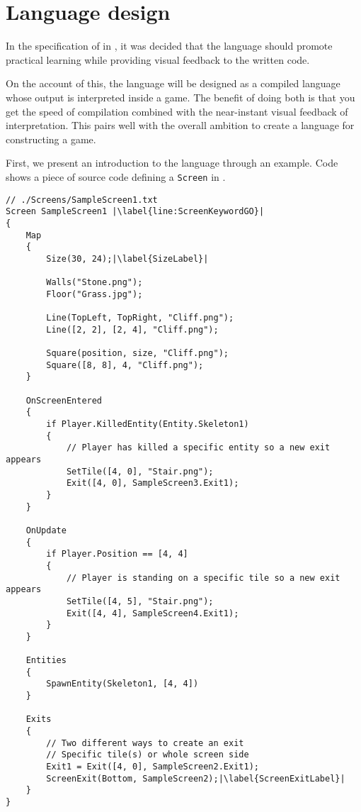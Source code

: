 \chapter{Language design}\label{chap:language_design}
In the specification of \dazel{} in , it was decided that the language should promote practical learning while providing visual feedback to the written code. 

On the account of this, the \dazel{} language will be designed as a compiled language whose output is interpreted inside a game.
The benefit of doing both is that you get the speed of compilation combined with the near-instant visual feedback of interpretation.
This pairs well with the overall ambition to create a language for constructing a game.

First, we present an introduction to the \dazel{} language through an example. Code  shows a piece of source code defining a \texttt{Screen} in \dazel{}. 

\begin{lstlisting}[language=CSharp, caption={Example screen.}, label={lst:SampleScreen1},escapechar=|]
// ./Screens/SampleScreen1.txt
Screen SampleScreen1 |\label{line:ScreenKeywordGO}|
{
    Map 
    {
        Size(30, 24);|\label{SizeLabel}|

        Walls("Stone.png"); 
        Floor("Grass.jpg");

        Line(TopLeft, TopRight, "Cliff.png");
        Line([2, 2], [2, 4], "Cliff.png");

        Square(position, size, "Cliff.png");
        Square([8, 8], 4, "Cliff.png");
    }

    OnScreenEntered
    {
        if Player.KilledEntity(Entity.Skeleton1) 
        {
            // Player has killed a specific entity so a new exit appears
            SetTile([4, 0], "Stair.png");
            Exit([4, 0], SampleScreen3.Exit1);
        }
    }

    OnUpdate
    {
        if Player.Position == [4, 4] 
        {
            // Player is standing on a specific tile so a new exit appears
            SetTile([4, 5], "Stair.png");
            Exit([4, 4], SampleScreen4.Exit1);
        }
    }

    Entities
    {
        SpawnEntity(Skeleton1, [4, 4])
    }
    
    Exits 
    {
        // Two different ways to create an exit
        // Specific tile(s) or whole screen side
        Exit1 = Exit([4, 0], SampleScreen2.Exit1);
        ScreenExit(Bottom, SampleScreen2);|\label{ScreenExitLabel}|
    }
}
\end{lstlisting}

